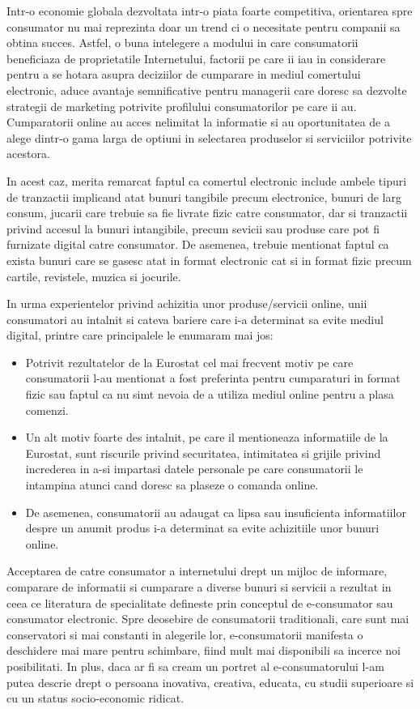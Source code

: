 \documentclass[a4paper, 12pt]{article}
\begin{document}
\quad 
Intr-o economie globala dezvoltata intr-o piata foarte competitiva, orientarea spre consumator nu mai reprezinta doar un trend ci o necesitate pentru companii sa obtina succes. Astfel, o buna intelegere a modului in care consumatorii beneficiaza de proprietatile Internetului, factorii pe care ii iau in considerare pentru a se hotara asupra deciziilor de cumparare in mediul comertului electronic, aduce avantaje semnificative pentru managerii care doresc sa dezvolte strategii de marketing potrivite profilului consumatorilor pe care ii au. Cumparatorii online au acces nelimitat la informatie si au oportunitatea de a alege dintr-o gama larga de optiuni in selectarea produselor si serviciilor potrivite acestora.

\quad In acest caz, merita remarcat faptul ca comertul electronic include ambele tipuri de tranzactii implicand atat bunuri tangibile precum electronice, bunuri de larg consum, jucarii care trebuie sa fie livrate fizic catre consumator, dar si tranzactii privind accesul la bunuri intangibile, precum sevicii sau produse care pot fi furnizate digital catre consumator. De asemenea, trebuie mentionat faptul ca exista bunuri care se gasesc atat in format electronic cat si in format fizic precum cartile, revistele, muzica si jocurile.

\quad In urma experientelor privind achizitia unor produse/servicii online, unii consumatori au intalnit si cateva bariere care i-a determinat sa evite mediul digital, printre care principalele le enumaram mai jos:
\begin{itemize}
	\item Potrivit rezultatelor de la Eurostat cel mai frecvent motiv pe care consumatorii l-au mentionat a fost preferinta pentru cumparaturi in format fizic sau faptul ca nu simt nevoia de a utiliza mediul online pentru a plasa comenzi.
	\item Un alt motiv foarte des intalnit, pe care il mentioneaza informatiile de la Eurostat, sunt riscurile privind securitatea, intimitatea si grijile privind increderea in a-si impartasi datele personale pe care consumatorii le intampina atunci cand doresc sa plaseze o comanda online.
	\item De asemenea, consumatorii au adaugat ca lipsa sau insuficienta informatiilor despre un anumit produs i-a determinat sa evite achizitiile unor bunuri online.
\end{itemize}

	\quad Acceptarea de catre consumator a internetului drept un mijloc de informare, comparare de informatii  si cumparare a diverse bunuri si servicii a rezultat in ceea ce literatura de specialitate defineste prin conceptul de e-consumator sau consumator electronic. Spre deosebire de consumatorii traditionali, care sunt mai conservatori si mai constanti in alegerile lor, e-consumatorii manifesta o deschidere mai mare pentru schimbare, fiind mult mai disponibili sa incerce noi posibilitati. In plus, daca ar fi sa cream un portret al e-consumatorului l-am putea descrie drept o persoana inovativa, creativa, educata, cu studii superioare si cu un status socio-economic ridicat.
	
\end{document}

